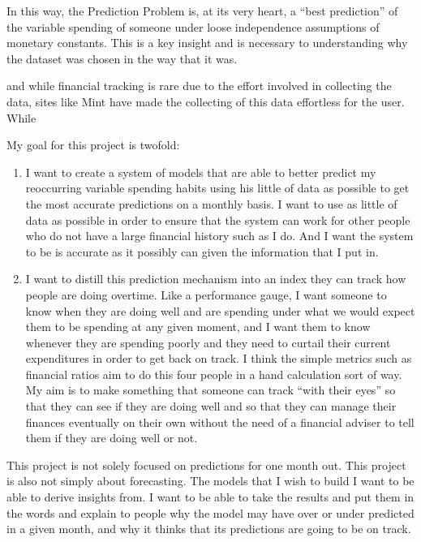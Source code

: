 \documentclass[11pt,a4paper]{article}
\begin{document}
In this way, the Prediction Problem is, at its very heart, a ``best prediction'' of the variable spending of someone under loose independence assumptions of monetary constants. This is a key insight and is necessary to understanding why the dataset was chosen in the way that it was. 



and while financial tracking is rare due to the effort involved in collecting the data, sites like Mint have made the collecting of this data effortless for the user. While 


My goal for this project is twofold: 
\begin{enumerate}
	\item I want to create a system of models that are able to better predict my reoccurring variable spending habits using his little of data as possible to get the most accurate predictions on a monthly basis.  I want to use as little of data as possible in order to ensure that the system can work for other people who do not have a large financial history such as I do. And I want the system to be is accurate as it possibly can given the information that I put in.
	\item I want to distill this prediction mechanism into an index they can track how people are doing overtime. Like a performance gauge, I want someone to know when they are doing well and are spending under what we would expect them to be spending at any given moment, and I want them to know whenever they are spending poorly and they need to curtail their current expenditures in order to get back on track. I think the simple metrics such as financial ratios aim to do this four people in a hand calculation sort of way. My aim is to make something that someone can track “with their eyes” so that they can see if they are doing well and so that they can manage their finances eventually on their own without the need of a financial adviser to tell them if they are doing well or not. 
\end{enumerate}

This project is not solely focused on predictions for one month out. This project is also not simply about forecasting. The models that I wish to build I want to be able to derive insights from. I want to be able to take the results and put them in the words and explain to people why the model may have over or under predicted in a given month, and why it thinks that its predictions are going to be on track. 
\end{document}
